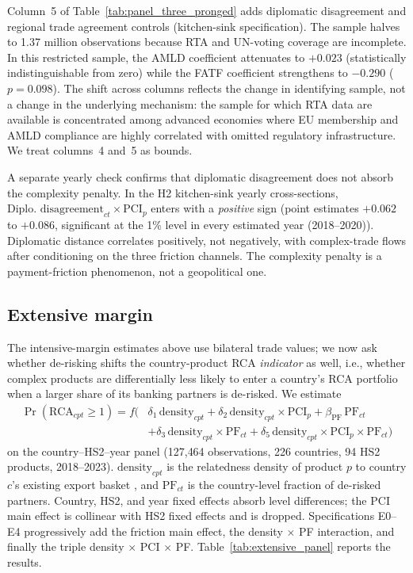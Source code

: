 Column~5 of Table~\ref{tab:panel_three_pronged} adds diplomatic disagreement and regional trade agreement controls (kitchen-sink specification). The sample halves to 1.37 million observations because RTA and UN-voting coverage are incomplete. In this restricted sample, the AMLD coefficient attenuates to $+0.023$ (statistically indistinguishable from zero) while the FATF coefficient strengthens to $-0.290$ ($p = 0.098$). The shift across columns reflects the change in identifying sample, not a change in the underlying mechanism: the sample for which RTA data are available is concentrated among advanced economies where EU membership and AMLD compliance are highly correlated with omitted regulatory infrastructure. We treat columns~4 and~5 as bounds.

A separate yearly check confirms that diplomatic disagreement does not absorb the complexity penalty. In the H2 kitchen-sink yearly cross-sections, $\text{Diplo. disagreement}_{ct} \times \text{PCI}_p$ enters with a \emph{positive} sign (point estimates $+0.062$ to $+0.086$, significant at the 1\% level in every estimated year (2018--2020)). Diplomatic distance correlates positively, not negatively, with complex-trade flows after conditioning on the three friction channels. The complexity penalty is a payment-friction phenomenon, not a geopolitical one.

\subsection{Extensive margin}
\label{subsec:extensive}

The intensive-margin estimates above use bilateral trade values; we now ask whether de-risking shifts the country-product RCA \emph{indicator} as well, i.e., whether complex products are differentially less likely to enter a country's RCA portfolio when a larger share of its banking partners is de-risked. We estimate
\begin{equation}
\begin{aligned}
\Pr(\text{RCA}_{cpt} \geq 1) = f\bigl(
&\delta_1\,\text{density}_{cpt} + \delta_2\,\text{density}_{cpt}\!\times\!\text{PCI}_p + \beta_{\text{PF}}\,\text{PF}_{ct} \\
&+ \delta_3\,\text{density}_{cpt}\!\times\!\text{PF}_{ct} + \delta_5\,\text{density}_{cpt}\!\times\!\text{PCI}_p\!\times\!\text{PF}_{ct}
\bigr)
\end{aligned}
\label{eq:extensive}
\end{equation}
on the country--HS2--year panel (127{,}464 observations, 226 countries, 94 HS2 products, 2018--2023). $\text{density}_{cpt}$ is the relatedness density of product $p$ to country $c$'s existing export basket \citep{Hidalgo2007_product_space}, and $\text{PF}_{ct}$ is the country-level fraction of de-risked partners. Country, HS2, and year fixed effects absorb level differences; the PCI main effect is collinear with HS2 fixed effects and is dropped. Specifications E0--E4 progressively add the friction main effect, the density$\,\times\,$PF interaction, and finally the triple density$\,\times\,$PCI$\,\times\,$PF. Table~\ref{tab:extensive_panel} reports the results.

